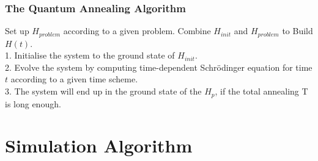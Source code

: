 \documentclass{beamer}
\begin{document}
\begin{frame}
	\frametitle{The Quantum Annealing Algorithm}
	\begin{tcolorbox}[title=Quantum Annealing Algorithm]
		Set up $H_{problem}$ according to a given problem. Combine $H_{init}$ and $H_{problem}$ to Build $H(t)$. \\
		
		1. Initialise the system to the ground state of $H_{init}$.\\ %
		
		
		
		2. Evolve the system by computing time-dependent Schrödinger equation for time $t$ according to a given time scheme. \\
		
		3. The system will end up in the ground state of the $H_p$, if the total annealing T is long enough.\\
		
	\end{tcolorbox} 
\end{frame}


\section{Simulation Algorithm}
\end{document}
